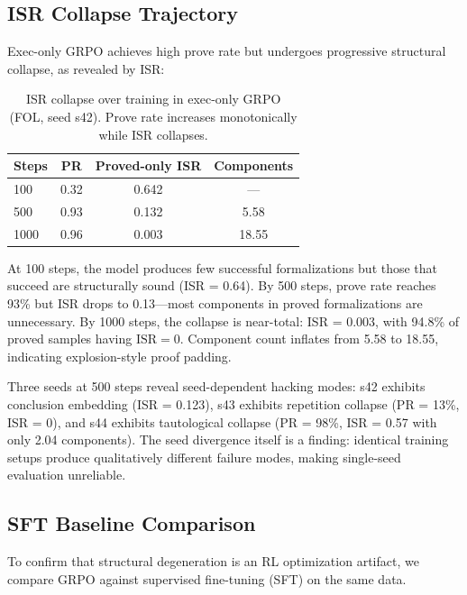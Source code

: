 \documentclass[11pt,twocolumn]{article}
\newcommand{\isr}{\textsc{ISR}}
\newcommand{\pr}{\textsc{PR}}
\newcommand{\grpo}{\textsc{GRPO}}
\begin{document}
\subsection{ISR Collapse Trajectory}

Exec-only \grpo{} achieves high prove rate but undergoes progressive structural collapse, as revealed by \isr{}:

\begin{table}[h]
\centering
\caption{\isr{} collapse over training in exec-only \grpo{} (FOL, seed s42). Prove rate increases monotonically while \isr{} collapses.}
\label{tab:collapse}
\small
\begin{tabular}{@{}lccc@{}}
\toprule
Steps & \pr{} & Proved-only \isr{} & Components \\
\midrule
100   & 0.32  & 0.642  & --- \\
500   & 0.93  & 0.132  & 5.58 \\
1000  & 0.96  & 0.003  & 18.55 \\
\bottomrule
\end{tabular}
\end{table}

At 100 steps, the model produces few successful formalizations but those that succeed are structurally sound (\isr{} = 0.64).
By 500 steps, prove rate reaches 93\% but \isr{} drops to 0.13---most components in proved formalizations are unnecessary.
By 1000 steps, the collapse is near-total: \isr{} = 0.003, with 94.8\% of proved samples having $\text{ISR}{=}0$.
Component count inflates from 5.58 to 18.55, indicating explosion-style proof padding.

Three seeds at 500 steps reveal seed-dependent hacking modes: s42 exhibits conclusion embedding (\isr{} = 0.123), s43 exhibits repetition collapse (\pr{} = 13\%, \isr{} = 0), and s44 exhibits tautological collapse (\pr{} = 98\%, \isr{} = 0.57 with only 2.04 components).
The seed divergence itself is a finding: identical training setups produce qualitatively different failure modes, making single-seed evaluation unreliable.

\subsection{SFT Baseline Comparison}

To confirm that structural degeneration is an RL optimization artifact, we compare \grpo{} against supervised fine-tuning (SFT) on the same data.
\end{document}
